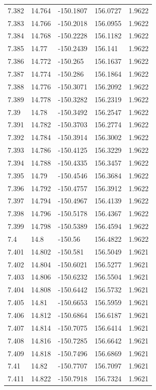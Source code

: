 \begin{tabular}{lllll}
7.382 & 14.764 & -150.1807 & 156.0727 & 1.9622 \\
7.383 & 14.766 & -150.2018 & 156.0955 & 1.9622 \\
7.384 & 14.768 & -150.2228 & 156.1182 & 1.9622 \\
7.385 & 14.77 & -150.2439 & 156.141 & 1.9622 \\
7.386 & 14.772 & -150.265 & 156.1637 & 1.9622 \\
7.387 & 14.774 & -150.286 & 156.1864 & 1.9622 \\
7.388 & 14.776 & -150.3071 & 156.2092 & 1.9622 \\
7.389 & 14.778 & -150.3282 & 156.2319 & 1.9622 \\
7.39 & 14.78 & -150.3492 & 156.2547 & 1.9622 \\
7.391 & 14.782 & -150.3703 & 156.2774 & 1.9622 \\
7.392 & 14.784 & -150.3914 & 156.3002 & 1.9622 \\
7.393 & 14.786 & -150.4125 & 156.3229 & 1.9622 \\
7.394 & 14.788 & -150.4335 & 156.3457 & 1.9622 \\
7.395 & 14.79 & -150.4546 & 156.3684 & 1.9622 \\
7.396 & 14.792 & -150.4757 & 156.3912 & 1.9622 \\
7.397 & 14.794 & -150.4967 & 156.4139 & 1.9622 \\
7.398 & 14.796 & -150.5178 & 156.4367 & 1.9622 \\
7.399 & 14.798 & -150.5389 & 156.4594 & 1.9622 \\
7.4 & 14.8 & -150.56 & 156.4822 & 1.9622 \\
7.401 & 14.802 & -150.581 & 156.5049 & 1.9621 \\
7.402 & 14.804 & -150.6021 & 156.5277 & 1.9621 \\
7.403 & 14.806 & -150.6232 & 156.5504 & 1.9621 \\
7.404 & 14.808 & -150.6442 & 156.5732 & 1.9621 \\
7.405 & 14.81 & -150.6653 & 156.5959 & 1.9621 \\
7.406 & 14.812 & -150.6864 & 156.6187 & 1.9621 \\
7.407 & 14.814 & -150.7075 & 156.6414 & 1.9621 \\
7.408 & 14.816 & -150.7285 & 156.6642 & 1.9621 \\
7.409 & 14.818 & -150.7496 & 156.6869 & 1.9621 \\
7.41 & 14.82 & -150.7707 & 156.7097 & 1.9621 \\
7.411 & 14.822 & -150.7918 & 156.7324 & 1.9621 \\

\end{tabular}
